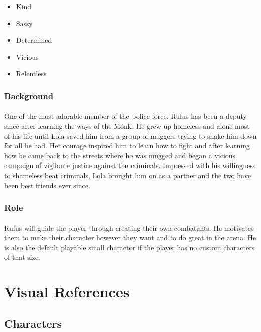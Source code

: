 \begin{itemize}
    \item Kind
    \item Sassy
    \item Determined
    \item Vicious
    \item Relentless
\end{itemize}

\subsubsection{Background}

\paragraph{} One of the most adorable member of the police force, Rufus has been a deputy since after learning the ways of the Monk. He grew up homeless and alone most of his life until Lola saved him from a group of muggers trying to shake him down for all he had. Her courage inspired him to learn how to fight and after learning how he came back to the streets where he was mugged and began a vicious campaign of vigilante justice against the criminals. Impressed with his willingness to shameless beat criminals, Lola brought him on as a partner and the two have been best friends ever since.

\subsubsection{Role}

\paragraph{} Rufus will guide the player through creating their own combatants. He motivates them to make their character however they want and to do great in the arena. He is also the default playable small character if the player has no custom characters of that size.

\section{Visual References}

\subsection{Characters}

